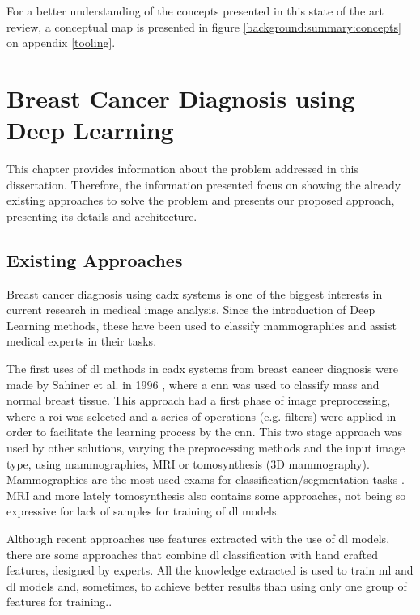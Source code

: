 \documentclass[
  twoside,
  11pt, a4paper,
  footinclude=true,
  headinclude=true,
  cleardoublepage=empty
]{scrbook}
\begin{document}
      For a better understanding of the concepts presented in this state of the art review, a conceptual map is presented in figure \ref{background:summary:concepts} on appendix \ref{tooling}.

  \chapter{Breast Cancer Diagnosis using Deep Learning}  \label{problem}
    This chapter provides information about the problem addressed in this dissertation. Therefore, the information presented focus on showing the already existing approaches to solve the problem and presents our proposed approach, presenting its details and architecture.

    \section{Existing Approaches} \label{problem:approaches}
      Breast cancer diagnosis using \gls{cadx} systems is one of the biggest interests in current research in medical image analysis. Since the introduction of Deep Learning methods, these have been used to classify mammographies and assist medical experts in their tasks.

      The first uses of \gls{dl} methods in \gls{cadx} systems from breast cancer diagnosis were made by Sahiner et al. in 1996 \cite{sahiner1996classification}, where a \gls{cnn} was used to classify mass and normal breast tissue. This approach had a first phase of image preprocessing, where a \gls{roi} was selected and a series of operations (e.g. filters) were applied in order to facilitate the learning process by the \gls{cnn}. This two stage approach was used by other solutions, varying the preprocessing methods and the input image type, using mammographies, MRI or tomosynthesis (3D mammography).
      Mammographies are the most used exams for classification/segmentation tasks \cite{sahiner1996classification,fonseca2015automatic,huynh2016digital,dhungel2016automated}.  MRI \cite{dalmis2017using} and more lately tomosynthesis \cite{fotin2016detection} also contains some approaches, not being so expressive for lack of samples for training of \gls{dl} models.

      Although recent approaches use features extracted with the use of \gls{dl} models, there are some approaches \cite{dhungel2016automated,kooi2016large,arevalo2016representation} that combine \gls{dl} classification with hand crafted features, designed by experts. All the knowledge extracted is used to train \gls{ml} and \gls{dl} models and, sometimes, to achieve better results than using only one group of features for training..
\end{document}
